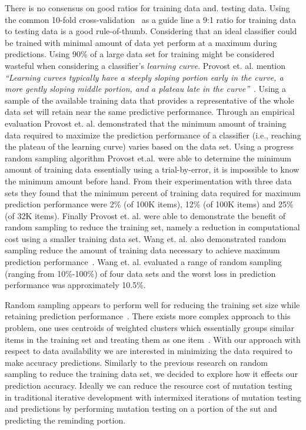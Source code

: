 There is no consensus on good ratios for training data and. testing data. Using the common 10-fold cross-validation~\cite{Koh95} as a guide line a 9:1 ratio for training data to testing data is a good rule-of-thumb. Considering that an ideal classifier could be trained with minimal amount of data yet perform at a maximum during predictions. Using 90\% of a large data set for training might be considered wasteful when considering a classifier's \emph{learning curve}. Provost et. al. mention \emph{``Learning curves typically have a steeply sloping portion early in the curve, a more gently sloping middle portion, and a plateau late in the curve''}~\cite{PJO99}. Using a sample of the available training data that provides a representative of the whole data set will retain near the same predictive performance. Through an empirical evaluation Provost et. al. demonstrated that the minimum amount of training data required to maximize the prediction performance of a classifier (i.e., reaching the plateau of the learning curve) varies based on the data set. Using a progress random sampling algorithm Provost et.al. were able to determine the minimum amount of training data essentially using a trial-by-error, it is impossible to know the minimum amount before hand. From their experimentation with three data sets they found that the minimum percent of training data required for maximum prediction performance were 2\% (of 100K items), 12\% (of 100K items) and 25\% (of 32K items). Finally Provost et. al. were able to demonstrate the benefit of random sampling to reduce the training set, namely a reduction in computational cost using a smaller training data set. Wang et. al. also demonstrated random sampling reduce the amount of training data necessary to achieve maximum prediction performance~\cite{WNC05}. Wang et. al. evaluated a range of random sampling (ranging from 10\%-100\%) of four data sets and the worst loss in prediction performance was approximately 10.5\%. 

Random sampling appears to perform well for reducing the training set size while retaining prediction performance~\cite{PJO99, WNC05}. There exists more complex approach to this problem, one uses centroids of weighted clusters which essentially groups similar items in the training set and treating them as one item~\cite{NBP08}. With our approach with respect to data availability we are interested in minimizing the data required to make accuracy predictions. Similarly to the previous research on random sampling to reduce the training data set, we decided to explore how it effects our prediction accuracy. Ideally we can reduce the resource cost of mutation testing in traditional iterative development with intermixed iterations of mutation testing and predictions by performing mutation testing on a portion of the \gls{sut} and predicting the reminding portion. 

